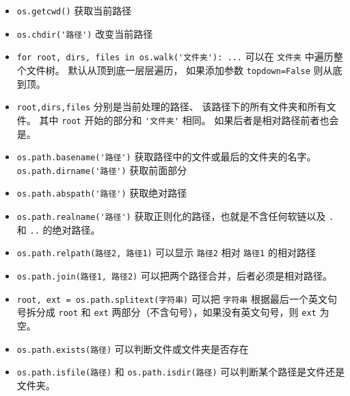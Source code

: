 
\begin{issues}
\issueDraft
\end{issues}

\begin{itemize}
\item \verb`os.getcwd()` 获取当前路径
\item \verb`os.chdir('路径')` 改变当前路径 
\item \verb`for root, dirs, files in os.walk('文件夹'): ...` 可以在 \verb`文件夹` 中遍历整个文件树。 默认从顶到底一层层遍历， 如果添加参数 \verb`topdown=False` 则从底到顶。
\item \verb`root,dirs,files` 分别是当前处理的路径、 该路径下的所有文件夹和所有文件。 其中 \verb`root` 开始的部分和 \verb`'文件夹'` 相同。 如果后者是相对路径前者也会是。
\item \verb`os.path.basename('路径')` 获取路径中的文件或最后的文件夹的名字。 \verb`os.path.dirname('路径')` 获取前面部分
\item \verb`os.path.abspath('路径')` 获取绝对路径
\item \verb`os.path.realname('路径')` 获取正则化的路径，也就是不含任何软链以及 \verb`.` 和 \verb`..` 的绝对路径。
\item \verb`os.path.relpath(路径2, 路径1)` 可以显示 \verb`路径2` 相对 \verb`路径1` 的相对路径
\item \verb`os.path.join(路径1, 路径2)` 可以把两个路径合并，后者必须是相对路径。
\item \verb`root, ext = os.path.splitext(字符串)` 可以把 \verb`字符串` 根据最后一个英文句号拆分成 \verb`root` 和 \verb`ext` 两部分（不含句号），如果没有英文句号，则 \verb`ext` 为空。
\item \verb`os.path.exists(路径)` 可以判断文件或文件夹是否存在
\item \verb`os.path.isfile(路径)` 和 \verb`os.path.isdir(路径)` 可以判断某个路径是文件还是文件夹。
\end{itemize}

